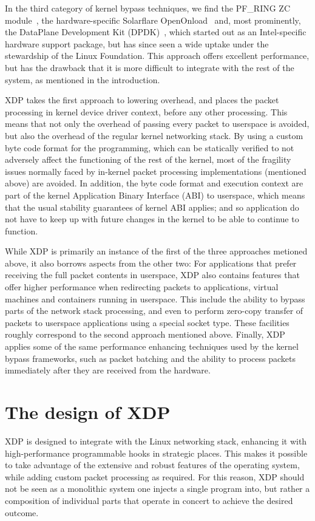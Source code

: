 \documentclass[10pt,sigconf]{acmart}
\begin{document}
In the third category of kernel bypass techniques, we find the PF\_RING ZC
module~\cite{pfringzc}, the hardware-specific Solarflare
OpenOnload~\cite{openonload} and, most prominently, the DataPlane Development
Kit (DPDK)~\cite{dpdk}, which started out as an Intel-specific hardware support
package, but has since seen a wide uptake under the stewardship of the Linux
Foundation. This approach offers excellent performance, but has the drawback
that it is more difficult to integrate with the rest of the system, as mentioned
in the introduction.

XDP takes the first approach to lowering overhead, and places the packet
processing in kernel device driver context, before any other processing. This
means that not only the overhead of passing every packet to userspace is
avoided, but also the overhead of the regular kernel networking stack. By using
a custom byte code format for the programming, which can be statically verified
to not adversely affect the functioning of the rest of the kernel, most of the
fragility issues normally faced by in-kernel packet processing implementations
(mentioned above) are avoided. In addition, the byte code format and execution
context are part of the kernel Application Binary Interface (ABI) to userspace,
which means that the usual stability guarantees of kernel ABI applies; and so
application do not have to keep up with future changes in the kernel to be able
to continue to function.

While XDP is primarily an instance of the first of the three approaches metioned
above, it also borrows aspects from the other two: For applications that prefer
receiving the full packet contents in userspace, XDP also contains features that
offer higher performance when redirecting packets to applications, virtual
machines and containers running in userspace. This include the ability to bypass
parts of the network stack processing, and even to perform zero-copy transfer of
packets to userspace applications using a special socket type. These facilities
roughly correspond to the second approach mentioned above. Finally, XDP applies
some of the same performance enhancing techniques used by the kernel bypass
frameworks, such as packet batching and the ability to process packets
immediately after they are received from the hardware.


\section{The design of XDP}
\label{sec:design}
XDP is designed to integrate with the Linux networking stack, enhancing it with
high-performance programmable hooks in strategic places. This makes it possible
to take advantage of the extensive and robust features of the operating system,
while adding custom packet processing as required. For this reason, XDP should
not be seen as a monolithic system one injects a single program into, but rather
a composition of individual parts that operate in concert to achieve the desired
outcome.
\end{document}
